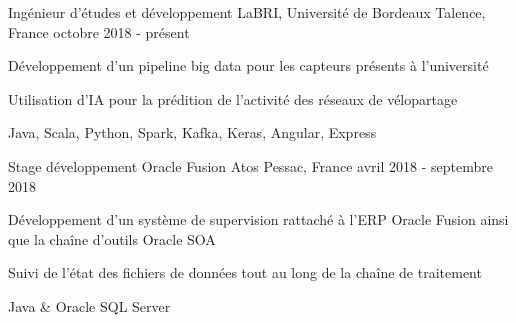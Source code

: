 
\begin{cventries}
	\cventry
	{Ingénieur d'études et développement}
	{LaBRI, Université de Bordeaux}
	{Talence, France}
	{octobre 2018 - présent}
	{
		\begin{cvitems}
			\item {Développement d'un pipeline big data pour les capteurs présents à l'université}
			\item {Utilisation d'IA pour la prédition de l'activité des réseaux de vélopartage}
			\item {Java, Scala, Python, Spark, Kafka, Keras, Angular, Express}
		\end{cvitems}
	}
	
	\cventry
	{Stage développement Oracle Fusion}
	{Atos}
	{Pessac, France}
	{avril 2018 - septembre 2018}
	{
		\begin{cvitems}
			\item {Développement d'un système de supervision rattaché à l'ERP Oracle Fusion ainsi que la chaîne d'outils Oracle SOA}
			\item {Suivi de l'état des fichiers de données tout au long de la chaîne de traitement}
			\item {Java \& Oracle SQL Server}
		\end{cvitems}
	}
	
\end{cventries}